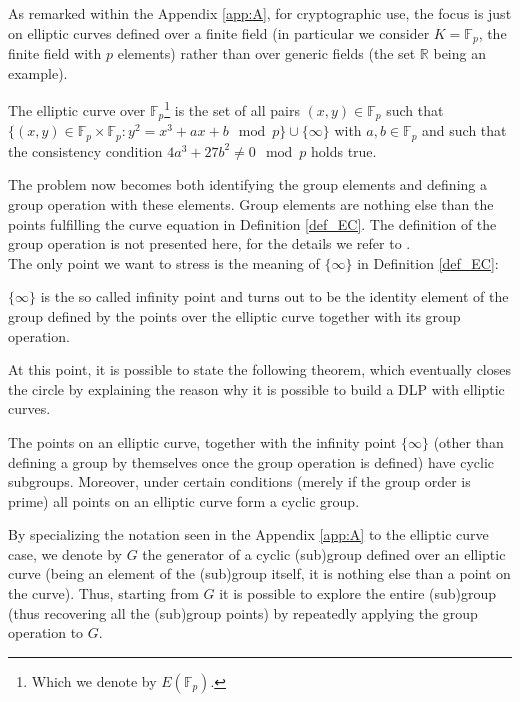 As remarked within the Appendix \ref{app:A}, for cryptographic use, the focus is just on elliptic curves defined over a finite field (in particular we consider $K = \mathbb{F}_p$, the finite field with $p$ elements) rather than over generic fields (the set $\mathbb{R}$ being an example).
\begin{mydef}
\label{def_EC}
    The elliptic curve over $\mathbb{F}_p$\footnote{Which we denote by $E(\mathbb{F}_p)$.} is the set of all pairs $(x,y) \in \mathbb{F}_p$ such that $\{(x,y) \in \mathbb{F}_p \times \mathbb{F}_p: y^2 = x^3 + ax+b \mod p\} \cup \{\infty\}$ with $a,b \in \mathbb{F}_p$ and such that the consistency condition $4 a^3+27b^2 \neq 0 \mod{p}$ holds true.
\end{mydef}
\noindent
The problem now becomes both identifying the group elements and defining a group operation with these elements. Group elements are nothing else than the points fulfilling the curve equation in Definition \ref{def_EC}. The definition of the group operation is not presented here, for the details we refer to \cite{UnderstandingCrypto}.\\
The only point we want to stress is the meaning of $\{\infty \}$ in Definition \ref{def_EC}:
\begin{myrem}
    $\{\infty \}$ is the so called infinity point and turns out to be the identity element of the group defined by the points over the elliptic curve together with its group operation.
\end{myrem}
\noindent
At this point, it is possible to state the following theorem, which eventually closes the circle by explaining the reason why it is possible to build a DLP with elliptic curves.
\begin{mytheorem}
    The points on an elliptic curve, together with the infinity point $\{\infty \}$ (other than defining a group by themselves once the group operation is defined) have cyclic subgroups. Moreover, under certain conditions (merely if the group order is prime) all points on an elliptic curve form a cyclic group.
\end{mytheorem}
\begin{myrem}
    By specializing the notation seen in the Appendix \ref{app:A} to the elliptic curve case, we denote by $G$ the generator of a cyclic (sub)group defined over an elliptic curve (being an element of the (sub)group itself, it is nothing else than a point on the curve). Thus, starting from $G$ it is possible to explore the entire (sub)group (thus recovering all the (sub)group points) by repeatedly applying the group operation to $G$.
\end{myrem}
